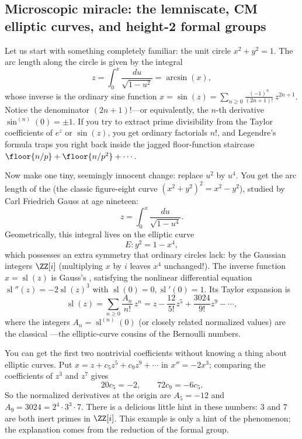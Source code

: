 \subsection{Microscopic miracle: the lemniscate, CM elliptic curves, and height-2 formal groups}

Let us start with something completely familiar: the unit circle \(x^2 + y^2 = 1\). The arc length along the circle is given by the integral
\[
  z = \int_0^x \frac{du}{\sqrt{1-u^2}} = \arcsin(x),
\]
whose inverse is the ordinary sine function \(x = \sin(z) = \sum_{n\ge 0} \frac{(-1)^n}{(2n+1)!}\,z^{2n+1}\). Notice the denominator \((2n+1)!\)---or equivalently, the \(n\)-th derivative \(\sin^{(n)}(0) = \pm 1\). If you try to extract prime divisibility from the Taylor coefficients of \(e^z\) or \(\sin(z)\), you get ordinary factorials \(n!\), and Legendre's formula traps you right back inside the jagged floor-function staircase \(\floor{n/p} + \floor{n/p^2} + \cdots\).

Now make one tiny, seemingly innocent change: replace \(u^2\) by \(u^4\). You get the arc length of the  (the classic figure-eight curve \((x^2+y^2)^2 = x^2-y^2\)), studied by Carl Friedrich Gauss at age nineteen:
\[
  z = \int_0^x \frac{du}{\sqrt{1-u^4}}.
\]
Geometrically, this integral lives on the elliptic curve
\[
  E : y^2 = 1 - x^4,
\]
which possesses an extra symmetry that ordinary circles lack:  by the Gaussian integers \(\ZZ[i]\) (multiplying \(x\) by \(i\) leaves \(x^4\) unchanged!). The inverse function \(x = \operatorname{sl}(z)\) is Gauss's , satisfying the nonlinear differential equation \(\operatorname{sl}''(z) = -2\operatorname{sl}(z)^3\) with \(\operatorname{sl}(0)=0, \operatorname{sl}'(0)=1\). Its Taylor expansion is
\[
  \operatorname{sl}(z) = \sum_{n \ge 0} \frac{A_n}{n!}\,z^n
  = z - \frac{12}{5!}z^5 + \frac{3024}{9!}z^9 - \cdots,
\]
where the integers \(A_n = \operatorname{sl}^{(n)}(0)\) (or closely related normalized values) are the classical ---the elliptic-curve cousins of the Bernoulli numbers.

You can get the first two nontrivial coefficients without knowing a thing about elliptic curves. Put \(x=z+c_5z^5+c_9z^9+\cdots\) in \(x''=-2x^3\); comparing the coefficients of \(z^3\) and \(z^7\) gives
\[
 20c_5=-2,\qquad 72c_9=-6c_5.
\]
So the normalized derivatives at the origin are \(A_5=-12\) and \(A_9=3024=2^4\cdot3^3\cdot7\). There is a delicious little hint in these numbers: \(3\) and \(7\) are both inert primes in \(\ZZ[i]\). This example is only a hint of the phenomenon; the explanation comes from the reduction of the formal group.

